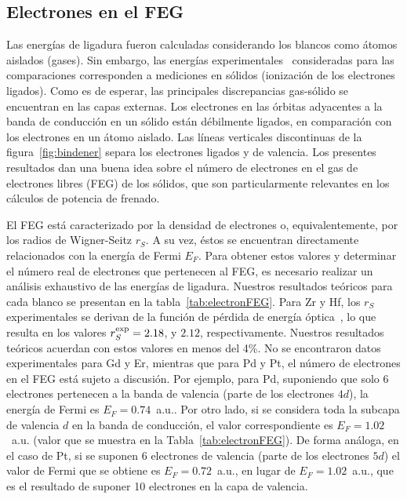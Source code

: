 \subsection{Electrones en el FEG}

Las energías de ligadura fueron calculadas considerando los blancos como 
átomos aislados (gases). Sin embargo, las energías 
experimentales~\cite{expdata} consideradas para las comparaciones 
corresponden a mediciones en sólidos (ionización de los electrones 
ligados). Como es de esperar, las principales discrepancias gas-sólido 
se encuentran en las capas externas. Los electrones en las órbitas 
adyacentes a la banda de conducción en un sólido están débilmente 
ligados, en comparación con los electrones en un átomo aislado. Las 
líneas verticales discontinuas de la figura~\ref{fig:bindener} separa los 
electrones ligados y de valencia. Los presentes resultados dan una 
buena idea sobre el número de electrones en el gas de electrones libres 
(FEG) de los sólidos, que son particularmente relevantes en los cálculos 
de potencia de frenado.

El FEG está caracterizado por la densidad de electrones o, 
equivalentemente, por los radios de Wigner-Seitz $r_S$. A su vez, éstos 
se encuentran directamente relacionados con la energía de Fermi $E_F$. 
Para obtener estos valores y determinar el número real de electrones que 
pertenecen al FEG, es necesario realizar un análisis exhaustivo de las 
energías de ligadura. Nuestros resultados teóricos para cada blanco se 
presentan en la tabla~\ref{tab:electronFEG}. Para Zr y Hf, los $r_S$ 
experimentales se derivan de la función de pérdida de energía 
óptica~\cite{werner,lynch,isaacson,romaniello}, lo que resulta en los 
valores $r_S^{\mbox{\scriptsize exp}}=2.18$, y $2.12$, respectivamente. 
Nuestros resultados teóricos acuerdan con estos valores en menos del 4\%. 
No se encontraron datos experimentales para Gd y Er, mientras que para 
Pd y Pt, el número de electrones en el FEG está sujeto a discusión. Por 
ejemplo, para Pd, suponiendo que solo 6 electrones pertenecen a la banda 
de valencia (parte de los electrones $4d$), la energía de Fermi es 
$E_F=0.74$~a.u.. Por otro lado, si se considera toda la subcapa de 
valencia $d$ en la banda de conducción, el valor correspondiente es 
$E_F=1.02$~a.u. (valor que se muestra en la Tabla~\ref{tab:electronFEG}). 
De forma análoga, en el caso de Pt, si se suponen 6 electrones de 
valencia (parte de los electrones $5d$) el valor de Fermi que se obtiene 
es $E_F=0.72$~a.u., en lugar de $E_F=1.02$~a.u., que es el resultado de 
suponer 10 electrones en la capa de valencia.

